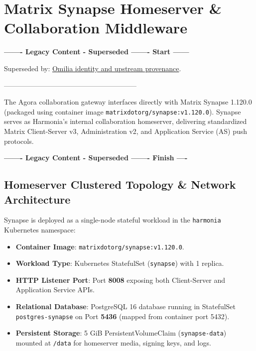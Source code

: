 
\chapter{Matrix Synapse Homeserver \& Collaboration Middleware}
\label{chap:matrix_synapse_middleware}


\par\noindent\textbf{------- Legacy Content - Superseded ------- Start ------}
\par\noindent Superseded by: \href{../../markdown/05-information-systems-architecture/agora-omilia-collaboration.md\#control-and-operations}{Omilia identity and upstream provenance}.
\par\noindent ---------------------------------------------------------

The Agora collaboration gateway interfaces directly with Matrix Synapse 1.120.0 (packaged using container image \nolinkurl{matrixdotorg/synapse:v1.120.0}). Synapse serves as Harmonia's internal collaboration homeserver, delivering standardized Matrix Client-Server v3, Administration v2, and Application Service (AS) push protocols.


\par\noindent\textbf{------- Legacy Content - Superseded ------- Finish ----}

\section{Homeserver Clustered Topology \& Network Architecture}

Synapse is deployed as a single-node stateful workload in the \nolinkurl{harmonia} Kubernetes namespace:
\begin{itemize}
    \item \textbf{Container Image}: \nolinkurl{matrixdotorg/synapse:v1.120.0}.
    \item \textbf{Workload Type}: Kubernetes StatefulSet (\nolinkurl{synapse}) with 1 replica.
    \item \textbf{HTTP Listener Port}: Port \textbf{8008} exposing both Client-Server and Application Service APIs.
    \item \textbf{Relational Database}: PostgreSQL 16 database running in StatefulSet \nolinkurl{postgres-synapse} on Port \textbf{5436} (mapped from container port 5432).
    \item \textbf{Persistent Storage}: 5 GiB PersistentVolumeClaim (\nolinkurl{synapse-data}) mounted at \nolinkurl{/data} for homeserver media, signing keys, and logs.
\end{itemize}

